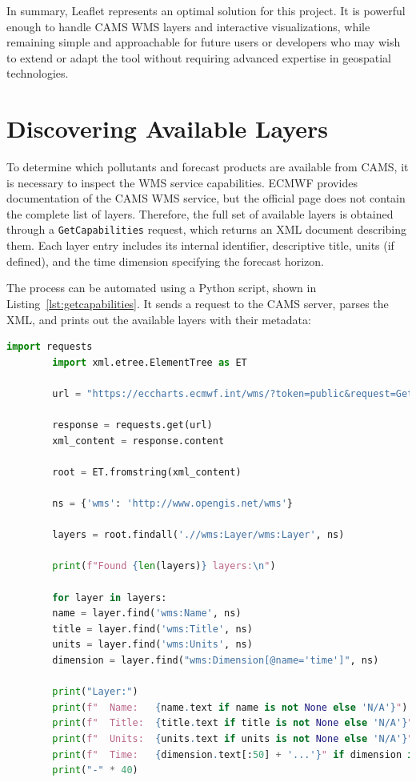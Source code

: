 In summary, Leaflet represents an optimal solution for this project. It is powerful enough to handle CAMS WMS layers and interactive visualizations, while remaining simple and approachable for future users or developers who may wish to extend or adapt the tool without requiring advanced expertise in geospatial technologies.  


\section{Discovering Available Layers}

To determine which pollutants and forecast products are available from CAMS, it is necessary to inspect the WMS service capabilities. ECMWF provides documentation of the CAMS WMS service, but the official page does not contain the complete list of layers. Therefore, the full set of available layers is obtained through a \texttt{GetCapabilities} request, which returns an XML document describing them. Each layer entry includes its internal identifier, descriptive title, units (if defined), and the time dimension specifying the forecast horizon.


The process can be automated using a Python script, shown in Listing~\ref{lst:getcapabilities}. It sends a request to the CAMS server, parses the XML, and prints out the available layers with their metadata:

 \begin{lstlisting}[language=Python, caption={Python script to extract CAMS layers from WMS GetCapabilities}, label={lst:getcapabilities}]
		import requests
		import xml.etree.ElementTree as ET
		
		url = "https://eccharts.ecmwf.int/wms/?token=public&request=GetCapabilities&version=1.3.0"
		
		response = requests.get(url)
		xml_content = response.content
		
		root = ET.fromstring(xml_content)
		
		ns = {'wms': 'http://www.opengis.net/wms'}
		
		layers = root.findall('.//wms:Layer/wms:Layer', ns)
		
		print(f"Found {len(layers)} layers:\n")
		
		for layer in layers:
		name = layer.find('wms:Name', ns)
		title = layer.find('wms:Title', ns)
		units = layer.find('wms:Units', ns)
		dimension = layer.find("wms:Dimension[@name='time']", ns)
		
		print("Layer:")
		print(f"  Name:   {name.text if name is not None else 'N/A'}")
		print(f"  Title:  {title.text if title is not None else 'N/A'}")
		print(f"  Units:  {units.text if units is not None else 'N/A'}")
		print(f"  Time:   {dimension.text[:50] + '...'}" if dimension is not None else "  Time:   N/A")
		print("-" * 40)
\end{lstlisting}

